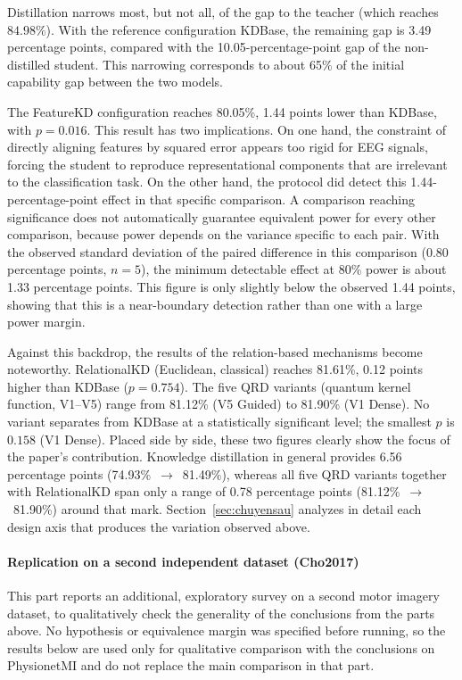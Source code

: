 Distillation narrows most, but not all, of the gap to the teacher
(which reaches $84.98\%$). With the reference configuration KDBase,
the remaining gap is 3.49 percentage points, compared with the
10.05-percentage-point gap of the non-distilled student. This
narrowing corresponds to about 65\% of the initial capability gap
between the two models.

The FeatureKD configuration reaches 80.05\%, 1.44 points lower than
KDBase, with $p = 0.016$. This result has two implications. On one
hand, the constraint of directly aligning features by squared error
appears too rigid for EEG signals, forcing the student to reproduce
representational components that are irrelevant to the
classification task. On the other hand, the protocol did detect this
1.44-percentage-point effect in that specific comparison. A
comparison reaching significance does not automatically guarantee
equivalent power for every other comparison, because power depends
on the variance specific to each pair. With the observed standard
deviation of the paired difference in this comparison (0.80
percentage points, $n=5$), the minimum detectable effect at 80\%
power is about 1.33 percentage points. This figure is only slightly
below the observed 1.44 points, showing that this is a
near-boundary detection rather than one with a large power margin.

Against this backdrop, the results of the relation-based mechanisms
become noteworthy. RelationalKD (Euclidean, classical) reaches
81.61\%, 0.12 points higher than KDBase ($p = 0.754$). The five QRD
variants (quantum kernel function, V1--V5) range from 81.12\% (V5
Guided) to 81.90\% (V1 Dense). No variant separates from KDBase at a
statistically significant level; the smallest $p$ is $0.158$ (V1
Dense). Placed side by side, these two figures clearly show the
focus of the paper's contribution. Knowledge distillation in general
provides 6.56 percentage points (74.93\%~$\to$~81.49\%), whereas all
five QRD variants together with RelationalKD span only a range of
0.78 percentage points (81.12\%~$\to$~81.90\%) around that mark.
Section~\ref{sec:chuyensau} analyzes in detail each design axis that
produces the variation observed above.

\paragraph{Replication on a second independent dataset (Cho2017)}

This part reports an additional, exploratory survey on a second
motor imagery dataset, to qualitatively check the generality of the
conclusions from the parts above. No hypothesis or equivalence
margin was specified before running, so the results below are used
only for qualitative comparison with the conclusions on PhysionetMI
and do not replace the main comparison in that part.

